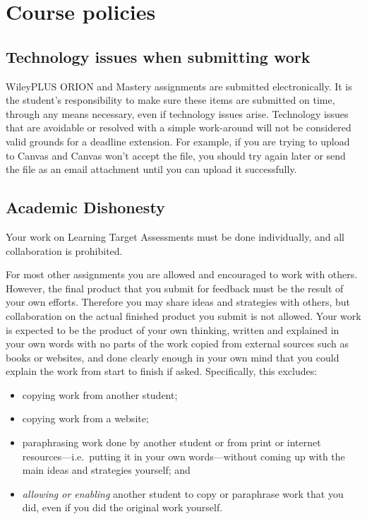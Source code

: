 \hypertarget{course-policies}{%
\section{Course policies}\label{course-policies}}

\hypertarget{technology-issues-when-submitting-work}{%
\subsection{Technology issues when submitting
work}\label{technology-issues-when-submitting-work}}

WileyPLUS ORION and Mastery assignments are submitted electronically. It
is the student's responsibility to make sure these items are submitted
on time, through any means necessary, even if technology issues arise.
Technology issues that are avoidable or resolved with a simple
work-around will not be considered valid grounds for a deadline
extension. For example, if you are trying to upload to Canvas and Canvas
won't accept the file, you should try again later or send the file as an
email attachment until you can upload it successfully.

\hypertarget{academic-dishonesty}{%
\subsection{Academic Dishonesty}\label{academic-dishonesty}}

Your work on Learning Target Assessments must be done individually, and
all collaboration is prohibited.

For most other assignments you are allowed and encouraged to work with
others. However, the final product that you submit for feedback must be
the result of your own efforts. Therefore you may share ideas and
strategies with others, but collaboration on the actual finished product
you submit is not allowed. Your work is expected to be the product of
your own thinking, written and explained in your own words with no parts
of the work copied from external sources such as books or websites, and
done clearly enough in your own mind that you could explain the work
from start to finish if asked. Specifically, this excludes:

\begin{itemize}
\tightlist
\item
  copying work from another student;
\item
  copying work from a website;
\item
  paraphrasing work done by another student or from print or internet
  resources---i.e.~putting it in your own words---without coming up with
  the main ideas and strategies yourself; and
\item
  \emph{allowing or enabling} another student to copy or paraphrase work
  that you did, even if you did the original work yourself.
\end{itemize}

